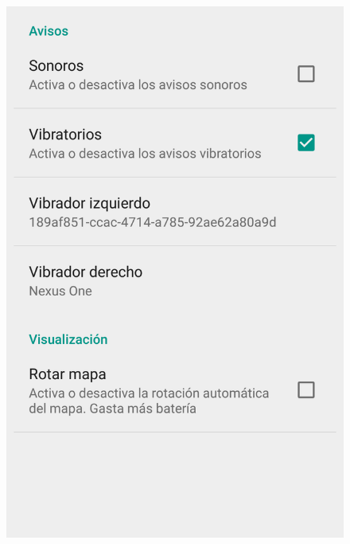 \begin{slide}
\begin{center}
\begin{minipage}[b]{0.3\linewidth}
\begin{center}
\begin{figure}
          \includegraphics[height=0.65\textheight]{img/naviganto-opcionesconfiguradas.png}
        \end{figure}
      \end{center}
    \end{minipage}
  \end{center}
\end{slide}

